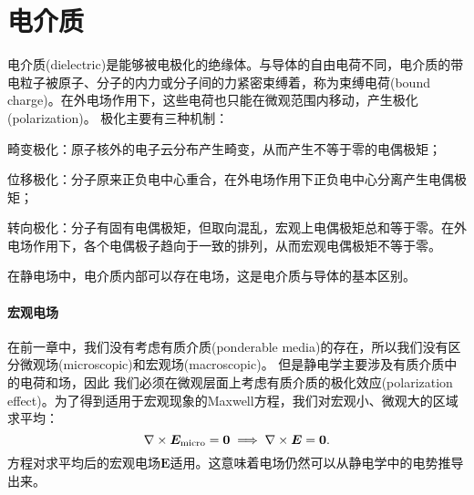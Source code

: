 \section{电介质}
\label{sec:dielectric}

电介质(dielectric)是能够被电极化的绝缘体。与导体的自由电荷不同，电介质的带电粒子被原子、分子的内力或分子间的力紧密束缚着，称为束缚电荷(bound charge)。在外电场作用下，这些电荷也只能在微观范围内移动，产生极化(polarization)。
极化主要有三种机制：
\begin{compactenum}
    \item 畸变极化：原子核外的电子云分布产生畸变，从而产生不等于零的电偶极矩；
    \item 位移极化：分子原来正负电中心重合，在外电场作用下正负电中心分离产生电偶极矩；
    \item 转向极化：分子有固有电偶极矩，但取向混乱，宏观上电偶极矩总和等于零。在外电场作用下，各个电偶极子趋向于一致的排列，从而宏观电偶极矩不等于零。
\end{compactenum}
在静电场中，电介质内部可以存在电场，这是电介质与导体的基本区别。
\paragraph{宏观电场}
在前一章中，我们没有考虑有质介质(ponderable media)的存在，所以我们没有区分微观场(microscopic)和宏观场(macroscopic)。
但是静电学主要涉及有质介质中的电荷和场，因此%
我们必须在微观层面上考虑有质介质的极化效应(polarization effect)。为了得到适用于宏观现象的Maxwell方程，我们对宏观小、微观大的区域求平均：%
\begin{equation}
    \label{eqn:curlE-macro}
    \nabla\times\bm E_\text{micro}=\bm 0\implies\nabla\times\bm E=\bm 0.
\end{equation}
方程对求平均后的宏观电场$\bm E$适用。这意味着电场仍然可以从静电学中的电势推导出来。

